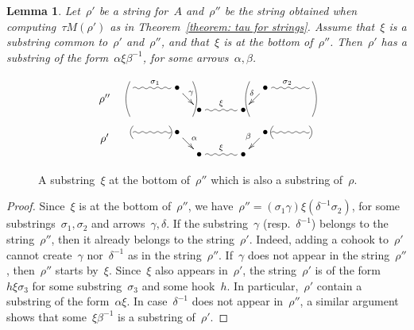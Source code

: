 \documentclass{amsart}
\newtheorem{lemma}[theorem]{Lemma}
\theoremstyle{definition}
\begin{document}
\begin{lemma}\label{lemma: xi equals nu}
Let~$\rho'$ be a string for~$A$ and~$\rho''$ be the string obtained when computing~$\tau M(\rho')$ as in Theorem~\ref{theorem: tau for strings}.
Assume that~$\xi$ is a substring common to~$\rho'$ and~$\rho''$, and that~$\xi$ is at the bottom of~$\rho''$.
Then~$\rho'$ has a substring of the form~$\alpha\xi\beta^{-1}$, for some arrows~$\alpha, \beta$.
\end{lemma}

\begin{figure}[h]
 	\capstart
\[
\xy
%
(-37,10.5)*+{\rho''};
(-28,14)="-14";
(-14,14)*+{\bullet}="-12";
(-7,7)*+{\bullet}="-11";
(7,7)*+{\bullet}="11";
(14,14)*+{\bullet}="12";
(28,14)="14";
%
{\ar@{~}^{\sigma_1} "-14";"-12"};
{\ar^{\!\!\gamma} "-12";"-11"};
{\ar@{~}^{\xi} "-11";"11"};
{\ar_{\delta\!\!} "12";"11"};
{\ar@{~}^{\sigma_2} "12";"14"};
%
{\ar@/^.3pc/@{-} (-29,5);(-29,16)};
{\ar@/_.3pc/@{-} (-9,5);(-9,16)};
%
{\ar@/^.3pc/@{-} (9,5);(9,16)};
{\ar@/_.3pc/@{-} (29,5);(29,16)};
%
%
%
(-37,-2)*+{\rho'};
(-28,0)="-4";
(-14,0)*+{\bullet}="-2";
(-7,-7)*+{\bullet}="-1";
(7,-7)*+{\bullet}="1";
(14,0)*+{\bullet}="2";
(28,0)="4";
%
{\ar@{~} "-4";"-2"};
{\ar^{\alpha} "-2";"-1"};
{\ar@{~}^{\xi} "-1";"1"};
{\ar_{\beta} "2";"1"};
{\ar@{~} "2";"4"};
%
{\ar@/^.2pc/@{-} (-28,-2);(-28,2)};
{\ar@/_.2pc/@{-} (-16.5,-2);(-16.5,2)};
%
{\ar@/_.2pc/@{-} (28,-2);(28,2)};
{\ar@/^.2pc/@{-} (16.5,-2);(16.5,2)};
%
\endxy
\]
    \caption{A substring~$\xi$ at the bottom of~$\rho''$ which is also a substring of~$\rho$.}
    \label{fig: xi equals nu}
    \vspace{-.3cm}
\end{figure}

\begin{proof}
 Since~$\xi$ is at the bottom of~$\rho''$, we have~$\rho''=(\sigma_1\gamma)\xi(\delta^{-1}\sigma_2)$, for some substrings~$\sigma_1,\sigma_2$ and arrows~$\gamma,\delta$.
 If the substring~$\gamma$ (resp.~$\delta^{-1}$) belongs to the string~$\rho''$, then it already belongs to the string~$\rho'$.
 Indeed, adding a cohook to~$\rho'$ cannot create~$\gamma$ nor~$\delta^{-1}$ as in the string~$\rho''$.
 If~$\gamma$ does not appear in the string~$\rho''$, then~$\rho''$ starts by~$\xi$.
 Since~$\xi$ also appears in~$\rho'$, the string~$\rho'$ is of the form~$h\xi\sigma_3$ for some substring~$\sigma_3$ and some hook~$h$.
 In particular,~$\rho'$ contain a substring of the form~$\alpha\xi$.
 In case~$\delta^{-1}$ does not appear in~$\rho''$, a similar argument shows that some~$\xi\beta^{-1}$ is a substring of~$\rho'$.
\end{proof}
\end{document}

